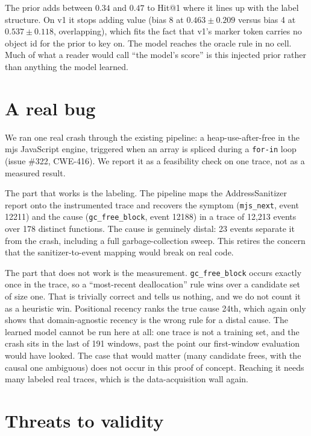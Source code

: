 \documentclass[11pt]{article}
\newcommand{\code}[1]{\texttt{#1}}
\begin{document}
The prior adds between $0.34$ and $0.47$ to Hit@1 where it lines up with the label structure. On v1 it stops adding value (bias 8 at $0.463 \pm 0.209$ versus bias 4 at $0.537 \pm 0.118$, overlapping), which fits the fact that v1's marker token carries no object id for the prior to key on. The model reaches the oracle rule in no cell. Much of what a reader would call ``the model's score'' is this injected prior rather than anything the model learned.

\section{A real bug}

We ran one real crash through the existing pipeline: a heap-use-after-free in the mjs JavaScript engine, triggered when an array is spliced during a \code{for-in} loop (issue \#322, CWE-416). We report it as a feasibility check on one trace, not as a measured result.

The part that works is the labeling. The pipeline maps the AddressSanitizer report onto the instrumented trace and recovers the symptom (\code{mjs\_next}, event 12211) and the cause (\code{gc\_free\_block}, event 12188) in a trace of 12{,}213 events over 178 distinct functions. The cause is genuinely distal: 23 events separate it from the crash, including a full garbage-collection sweep. This retires the concern that the sanitizer-to-event mapping would break on real code.

The part that does not work is the measurement. \code{gc\_free\_block} occurs exactly once in the trace, so a ``most-recent deallocation'' rule wins over a candidate set of size one. That is trivially correct and tells us nothing, and we do not count it as a heuristic win. Positional recency ranks the true cause 24th, which again only shows that domain-agnostic recency is the wrong rule for a distal cause. The learned model cannot be run here at all: one trace is not a training set, and the crash sits in the last of 191 windows, past the point our first-window evaluation would have looked. The case that would matter (many candidate frees, with the causal one ambiguous) does not occur in this proof of concept. Reaching it needs many labeled real traces, which is the data-acquisition wall again.

\section{Threats to validity}
\end{document}
